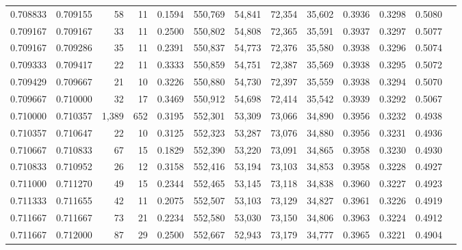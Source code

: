 \begin{tabular}{rrrrrrrrrrrrr}
0.708833 & 0.709155 &    58 &  11 &                                     0.1594 & 550,769 &  54,841 &  72,354 &  35,602 & 0.3936 & 0.3298 & 0.5080 \\
0.709167 & 0.709167 &    33 &  11 &                                     0.2500 & 550,802 &  54,808 &  72,365 &  35,591 & 0.3937 & 0.3297 & 0.5077 \\
0.709167 & 0.709286 &    35 &  11 &                                     0.2391 & 550,837 &  54,773 &  72,376 &  35,580 & 0.3938 & 0.3296 & 0.5074 \\
0.709333 & 0.709417 &    22 &  11 &                                     0.3333 & 550,859 &  54,751 &  72,387 &  35,569 & 0.3938 & 0.3295 & 0.5072 \\
0.709429 & 0.709667 &    21 &  10 &                                     0.3226 & 550,880 &  54,730 &  72,397 &  35,559 & 0.3938 & 0.3294 & 0.5070 \\
0.709667 & 0.710000 &    32 &  17 &                                     0.3469 & 550,912 &  54,698 &  72,414 &  35,542 & 0.3939 & 0.3292 & 0.5067 \\
0.710000 & 0.710357 & 1,389 & 652 &                                     0.3195 & 552,301 &  53,309 &  73,066 &  34,890 & 0.3956 & 0.3232 & 0.4938 \\
0.710357 & 0.710647 &    22 &  10 &                                     0.3125 & 552,323 &  53,287 &  73,076 &  34,880 & 0.3956 & 0.3231 & 0.4936 \\
0.710667 & 0.710833 &    67 &  15 &                                     0.1829 & 552,390 &  53,220 &  73,091 &  34,865 & 0.3958 & 0.3230 & 0.4930 \\
0.710833 & 0.710952 &    26 &  12 &                                     0.3158 & 552,416 &  53,194 &  73,103 &  34,853 & 0.3958 & 0.3228 & 0.4927 \\
0.711000 & 0.711270 &    49 &  15 &                                     0.2344 & 552,465 &  53,145 &  73,118 &  34,838 & 0.3960 & 0.3227 & 0.4923 \\
0.711333 & 0.711655 &    42 &  11 &                                     0.2075 & 552,507 &  53,103 &  73,129 &  34,827 & 0.3961 & 0.3226 & 0.4919 \\
0.711667 & 0.711667 &    73 &  21 &                                     0.2234 & 552,580 &  53,030 &  73,150 &  34,806 & 0.3963 & 0.3224 & 0.4912 \\
0.711667 & 0.712000 &    87 &  29 &                                     0.2500 & 552,667 &  52,943 &  73,179 &  34,777 & 0.3965 & 0.3221 & 0.4904 \\

\end{tabular}
